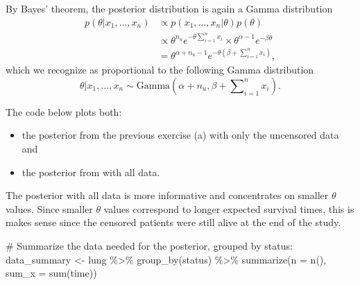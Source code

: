 \documentclass[
  letterpaper,
  DIV=11,
  numbers=noendperiod]{scrartcl}
\newenvironment{Shaded}{\begin{snugshade}}{\end{snugshade}}
\newcommand{\AttributeTok}[1]{\textcolor[rgb]{0.40,0.45,0.13}{#1}}
\newcommand{\CommentTok}[1]{\textcolor[rgb]{0.37,0.37,0.37}{#1}}
\newcommand{\DecValTok}[1]{\textcolor[rgb]{0.68,0.00,0.00}{#1}}
\newcommand{\FunctionTok}[1]{\textcolor[rgb]{0.28,0.35,0.67}{#1}}
\newcommand{\NormalTok}[1]{\textcolor[rgb]{0.00,0.23,0.31}{#1}}
\newcommand{\OtherTok}[1]{\textcolor[rgb]{0.00,0.23,0.31}{#1}}
\newcommand{\SpecialCharTok}[1]{\textcolor[rgb]{0.37,0.37,0.37}{#1}}
\providecommand{\tightlist}{%
  \setlength{\itemsep}{0pt}\setlength{\parskip}{0pt}}
\begin{document}
\begin{tcolorbox}
By Bayes' theorem, the posterior distribution is again a Gamma
distribution \[
\begin{align}
p(\theta \vert x_1,\ldots,x_n) & \propto p(x_1,\ldots,x_n \vert \theta)p(\theta) \\
& \propto \theta^{n_u} e^{-\theta\sum_{i = 1}^n x_i} \times \theta^{\alpha-1}e^{-\beta\theta} \\
& = \theta^{\alpha + n_u - 1} e^{ -\theta(\beta + \sum_{i = 1}^n x_i)},
\end{align}
\] which we recognize as proportional to the following Gamma
distribution \[
\theta \vert x_1,\ldots,x_n \sim \mathrm{Gamma}(\alpha + n_u,\beta + \sum\nolimits_{i=1}^n x_i).
\]

The code below plots both:

\begin{itemize}
\tightlist
\item
  the posterior from the previous exercise (a) with only the uncensored
  data and
\item
  the posterior from with all data.
\end{itemize}

The posterior with all data is more informative and concentrates on
smaller \(\theta\) values. Since smaller \(\theta\) values correspond to
longer expected survival times, this is makes sense since the censored
patients were still alive at the end of the study.

\begin{Shaded}
\begin{Highlighting}[]
\CommentTok{\# Summarize the data needed for the posterior, grouped by \textasciigrave{}status\textasciigrave{}:}
\NormalTok{data\_summary }\OtherTok{\textless{}{-}}\NormalTok{ lung }\SpecialCharTok{\%\textgreater{}\%} \FunctionTok{group\_by}\NormalTok{(status) }\SpecialCharTok{\%\textgreater{}\%} \FunctionTok{summarize}\NormalTok{(}\AttributeTok{n =} \FunctionTok{n}\NormalTok{(), }\AttributeTok{sum\_x =} \FunctionTok{sum}\NormalTok{(time))}
\end{Highlighting}
\end{Shaded}

\begin{Shaded}
\end{Shaded}
\end{tcolorbox}
\end{document}
